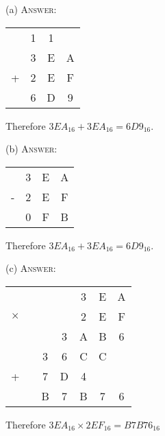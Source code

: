 
(a)
\textsc{Answer:}\vspace{-2mm}
\begin{answerlong}
\begin{longtable}{cccc}
  & 1 & 1 &   \\
  & 3 & E & A \\
+ & 2 & E & F \\\hline
  & 6 & D & 9 \\\hline
\end{longtable}
Therefore $3EA_{16} + 3EA_{16} = 6D9_{16}$.
\end{answerlong}
  
(b)
\textsc{Answer:}\vspace{-2mm}
\begin{answerlong}
\begin{longtable}{cccc}
  & 3 & E & A \\
- & 2 & E & F \\\hline
  & 0 & F & B \\\hline
\end{longtable}
Therefore $3EA_{16} + 3EA_{16} = 6D9_{16}$.
\end{answerlong}

(c)
\textsc{Answer:}\vspace{-2mm}
\begin{answerlong}
    \begin{longtable}{ccccccc}
            &   &   &   & 3 & E & A \\
$\times$    &   &   &   & 2 & E & F \\ \hline
            &   &   & 3 & A & B & 6 \\
            &   & 3 & 6 & C & C &   \\
+           &   & 7 & D & 4 &   &   \\ \hline
            &   & B & 7 & B & 7 & 6 \\ \hline
\end{longtable}
Therefore $3EA_{16} \times 2EF_{16} = B7B76_{16}$
\end{answerlong}
